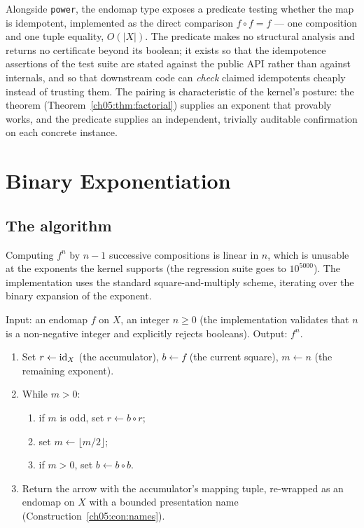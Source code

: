 \begin{remark}
\label{ch05:rem:idempredicate}
Alongside \texttt{power}, the endomap type exposes a predicate testing
whether the map is idempotent, implemented as the direct comparison
$f \circ f = f$ --- one composition and one tuple equality, $O(|X|)$.
The predicate makes no structural analysis and returns no certificate
beyond its boolean; it exists so that the idempotence assertions of the
test suite are stated against the public API rather than against
internals, and so that downstream code can \emph{check} claimed
idempotents cheaply instead of trusting them. The pairing is
characteristic of the kernel's posture: the theorem
(Theorem~\ref{ch05:thm:factorial}) supplies an exponent that provably
works, and the predicate supplies an independent, trivially auditable
confirmation on each concrete instance.
\end{remark}

\section{Binary Exponentiation}
\label{ch05:sec:binexp}

\subsection{The algorithm}

Computing $f^{n}$ by $n - 1$ successive compositions is linear in $n$,
which is unusable at the exponents the kernel supports (the regression
suite goes to $10^{5000}$). The implementation uses the standard
square-and-multiply scheme, iterating over the binary expansion of the
exponent.

\begin{algorithm}
\label{ch05:alg:binexp}
Input: an endomap $f$ on $X$, an integer $n \ge 0$ (the implementation
validates that $n$ is a non-negative integer and explicitly rejects
booleans). Output: $f^{n}$.
\begin{enumerate}
\item Set $r \leftarrow \mathrm{id}_X$ (the accumulator), $b \leftarrow f$ (the
current square), $m \leftarrow n$ (the remaining exponent).
\item While $m > 0$:
  \begin{enumerate}
  \item if $m$ is odd, set $r \leftarrow b \circ r$;
  \item set $m \leftarrow \lfloor m / 2 \rfloor$;
  \item if $m > 0$, set $b \leftarrow b \circ b$.
  \end{enumerate}
\item Return the arrow with the accumulator's mapping tuple, re-wrapped as
an endomap on $X$ with a bounded presentation name
(Construction~\ref{ch05:con:names}).
\end{enumerate}
\end{algorithm}

